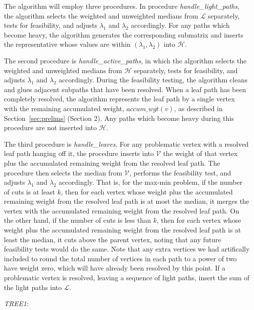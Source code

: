 \documentclass[12pt]{article}
\begin{document}
\begin{spacing}{1.5}
The algorithm will employ three procedures. In procedure {\it handle\_light\_paths}, the algorithm selects the weighted and unweighted medians from $\mathcal{L}$ separately, tests for feasibility, and adjusts $\lambda_1$ and $\lambda_2$ accordingly. For any paths which become heavy, the algorithm generates the corresponding submatrix and inserts the representative whose values are within $(\lambda_1,\lambda_2)$ into $\mathcal{H}$.

The second procedure is {\it handle\_active\_paths}, in which the algorithm selects the weighted and unweighted medians from $\mathcal{H}$ separately, tests for feasibility, and adjusts $\lambda_1$ and $\lambda_2$ accordingly. During the feasibility testing, the algorithm cleans and glues adjacent subpaths that have been resolved.
When a leaf path has been completely resolved, the algorithm represents the leaf path by a single vertex with the remaining accumulated weight, $accum\_wgt(v)$, as described in Section~\ref{sec:prelims} (Section 2). Any paths which become heavy during this procedure are not inserted into $\mathcal{H}$.

The third procedure is {\it handle\_leaves}.  For any problematic vertex with a resolved leaf path hanging off it, the procedure inserts into $\mathcal{V}$ the weight of that vertex plus the accumulated remaining weight from the resolved leaf path. The procedure then selects the median from $\mathcal{V}$, performs the feasibility test, and adjusts $\lambda_1$ and $\lambda_2$ accordingly. That is, for the max-min problem, if the number of cuts is at least $k$, then for each vertex whose weight plus the accumulated remaining weight from the resolved leaf path is at most the median, it merges the vertex with the accumulated remaining weight from the resolved leaf path. On the other hand, if the number of cuts is less than $k$, then for each vertex whose weight plus the accumulated remaining weight from the resolved leaf path is at least the median, it cuts above the parent vertex, noting that any future feasibility tests would do the same. Note that any extra vertices we had artifically included to round the total number of vertices in each path to a power of two have weight zero, which will have already been resolved by this point. If a problematic vertex is resolved, leaving a sequence of light paths, insert the sum of the light paths into $\mathcal{L}$.
\end{spacing}
\bigskip
\sspace
\noindent
{\it TREE1}:\vspace{.05in} \\
\end{document}

